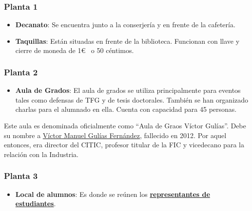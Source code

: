 \subsubsection{Planta 1}

\begin{itemize}

    \item \textbf{Decanato}: Se encuentra junto a la conserjería y en frente de la cafetería. 

    \item \textbf{Taquillas}: Están situadas en frente de la biblioteca. Funcionan con llave y cierre de moneda de 1\euro~ o 50 céntimos.
    
\end{itemize}

\subsubsection{Planta 2}

\begin{itemize}
    \item \textbf{Aula de Grados}: El aula de grados se utiliza principalmente para eventos tales como defensas de \acrshort{TFG} y de tesis doctorales. También se han organizado charlas para el alumnado en ella. Cuenta con capacidad para 45 personas. 
\end{itemize}

\begin{curiosityBox}
    Este aula es denominada oficialmente como “Aula de Graos Víctor Gulías”. Debe su nombre a \href{https://badalnovas.com/2024/01/28/in-memoriam-victor-manuel-gulias-fernandez-10o-aniversario-do-seu-falecemento/}{Víctor Manuel Gulías Fernández}, fallecido en 2012. Por aquel entonces, era director del \acrshort{CITIC}, profesor titular de la \acrshort{FIC} y vicedecano para la relación con la Industria.   
\end{curiosityBox}

\subsubsection{Planta 3}

\begin{itemize}
    \item \textbf{Local de alumnos}: Es donde se reúnen los \href{https://www.fic.udc.es/gl/delegacion-e-asociacions}{\textbf{representantes de estudiantes}}.
\end{itemize}

